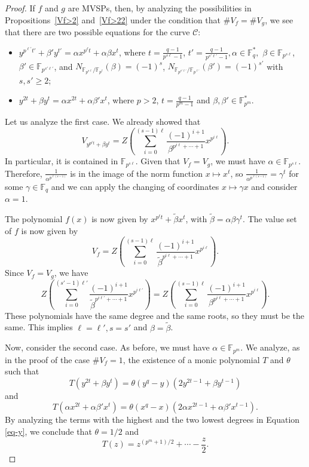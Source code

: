 \documentclass[preprint,12pt]{elsarticle}
\begin{document}
\begin{proof}
  If $f$ and $g$ are MVSPs, then, by analyzing the possibilities in Propositions~\ref{Vf>2} and~\ref{Vf>22} under the condition that $\# V_f = \# V_g$, we see that there are two possible equations for the curve $\mathcal{C}$:
    \begin{itemize}
        \item $y^{p^{\ell'}t'} + \beta' y^{t'} = \alpha x^{p^{\ell}t} + \alpha \beta x^t$, where $t = \frac{q - 1}{p^{s\ell} - 1}$, $t' = \frac{q - 1}{p^{s'\ell'} - 1}, \alpha \in \mathbb{F}_q^*,$ $\beta \in \mathbb{F}_{p^{s\ell}}$, $\beta' \in \mathbb{F}_{p^{s'\ell'}}$, and $N_{\mathbb{F}_{p^{s\ell}}/\mathbb{F}_{p^{\ell}}}(\beta) = (-1)^s$, $N_{\mathbb{F}_{p^{s'\ell'}}/\mathbb{F}_{p^{\ell'}}}(\beta') = (-1)^{s'}$ with $s, s' \geq 2$;

        \item $y^{2t} + \beta y^{t} = \alpha x^{2t}  + \alpha \beta' x^t$, where $p > 2$, $t = \frac{q - 1}{p^m - 1}$ and $\beta, \beta' \in \mathbb{F}_{p^{m}}^*$.
    \end{itemize}

    Let us analyze the first case. We already showed that
    $$V_{y^{p^{\ell}t}+\beta y^t} = Z\left(\sum_{i = 0}^{(s - 1)\ell}\frac{(-1)^{i + 1}}{\beta^{p^{i\ell} + \cdots + 1}}x^{p^{i\ell}}\right).$$
    In particular, it is contained in $\mathbb{F}_{p^{s\ell}}$. Given that $V_f = V_g$, we must have $\alpha \in \mathbb{F}_{p^{s\ell}}$. Therefore, $\frac{1}{\alpha^{p^{\ell(s - 1)}}}$ is in the image of the norm function $x \mapsto x^t$, so $\frac{1}{\alpha^{p^{\ell(s - 1)}}} = \gamma^t$ for some $\gamma \in \mathbb{F}_q$ and we can apply the changing of coordinates $x \mapsto \gamma x$ and consider $\alpha = 1$.
    
    The polynomial $f(x)$ is now given by $x^{p^{\ell}t} + \tilde{\beta}x^t$, with $\tilde{\beta} = \alpha \beta \gamma^t$. The value set of $f$ is now given by
    $$V_f = Z\left(\sum_{i = 0}^{(s - 1)\ell}\frac{(-1)^{i + 1}}{\tilde{\beta}^{p^{i\ell} + \cdots + 1}}x^{p^{i\ell}}\right).$$
    Since $V_f = V_g$, we have
    $$Z\left(\sum_{i = 0}^{(s' - 1)\ell'}\frac{(-1)^{i + 1}}{\tilde{\beta}^{p^{i\ell'} + \cdots + 1}}x^{p^{i\ell'}}\right) = Z\left(\sum_{i = 0}^{(s - 1)\ell}\frac{(-1)^{i + 1}}{\beta^{p^{i\ell} + \cdots + 1}}x^{p^{i\ell}}\right).$$
    These polynomials have the same degree and the same roots, so they must be the same. This implies $\ell = \ell', s = s'$ and $\beta = \tilde{\beta}$.

    Now, consider the second case. As before, we must have $\alpha \in \mathbb{F}_{p^m}$. We analyze, as in the proof of the case $\# V_f = 1$, the existence of a monic polynomial $T$ and $\theta$ such that
    \begin{equation}\label{eq-y}
        T(y^{2t}+\beta y^t) = \theta(y^q - y)(2y^{2t - 1} + \beta y^{t - 1})
    \end{equation}
    and 
    $$T(\alpha x^{2t} + \alpha\beta' x^t) = \theta(x^q - x)(2\alpha x^{2t-1} + \alpha\beta' x^{t-1}).$$
    By analyzing the terms with the highest and the two lowest degrees in Equation \eqref{eq-y}, we conclude that $\theta = 1/2$ and
    $$T(z) = z^{(p^m+1)/2} + \cdots -\frac{z}{2}.$$
    

\end{proof}
\end{document}
